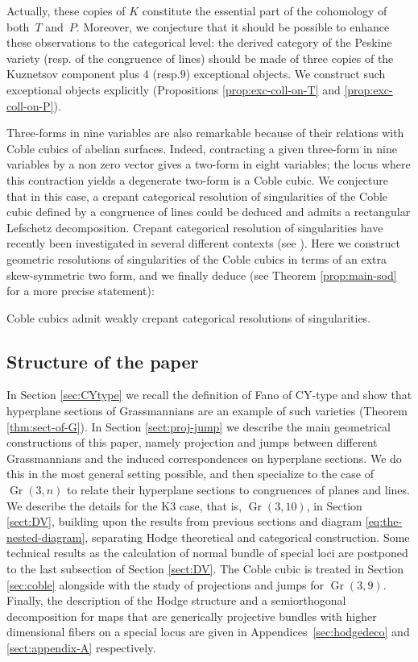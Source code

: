 \documentclass[11pt]{article}
\newcommand{\resp}{resp.\xspace}
\theoremstyle{plain}
\theoremstyle{definition}
\DeclareMathOperator{\Gr}{Gr}
\begin{document}
Actually, these copies of $K$ constitute the essential part of the cohomology
of both~$T$ and~$P$.
Moreover, we conjecture that it should be possible to enhance these observations to the categorical
level: the derived category of the Peskine variety (\resp of the congruence of lines)
should be made of three copies of the Kuznetsov component plus $4$ (\resp $9$) exceptional
objects. We construct such exceptional objects explicitly (Propositions \ref{prop:exc-coll-on-T} and \ref{prop:exc-coll-on-P}).

Three-forms in nine variables are also remarkable because of their relations with
Coble cubics of abelian surfaces. Indeed, contracting a given
three-form in nine variables by a non zero vector gives a two-form in eight
variables; the locus where this contraction yields a degenerate two-form is
a Coble cubic. We conjecture that in this case, a crepant categorical
resolution of singularities of the Coble cubic defined by a congruence of lines could be deduced and admits a rectangular Lefschetz decomposition. Crepant categorical resolution of singularities
have recently been investigated in several different contexts (see \cite{kuz-lefschetz,
leuschke, lunts}). Here we construct geometric resolutions of
singularities of the Coble cubics in terms of an extra skew-symmetric two form,
and we finally deduce
(see Theorem \ref{prop:main-sod} for a more precise statement):

\begin{theorem*}
Coble cubics admit weakly crepant categorical resolutions of singularities.
\end{theorem*}

\subsection*{Structure of the paper}
In Section \ref{sec:CYtype} we recall the definition of Fano of CY-type and show that hyperplane sections of Grassmannians are an
example of such varieties (Theorem \ref{thm:sect-of-G}). In Section \ref{sect:proj-jump} we describe the main geometrical constructions
of this paper, namely projection and jumps between different Grassmannians and the induced correspondences on hyperplane sections.
We do this in the most general setting possible, and then specialize to the case of $\Gr(3,n)$ to relate their hyperplane sections
to congruences of planes and lines. We describe the details for the K3 case, that is, $\Gr(3,10)$, in Section \ref{sect:DV}, building upon the results
from previous sections and diagram \eqref{eq:the-nested-diagram}, separating Hodge theoretical and categorical construction. Some technical
results as the calculation of normal bundle of special loci are postponed to the last subsection of Section \ref{sect:DV}.
The Coble cubic is treated in Section \ref{sec:coble} alongside with the study of projections and jumps for $\Gr(3,9)$.
Finally, the description of the Hodge structure and a semiorthogonal decomposition for maps that are generically projective bundles
with higher dimensional fibers on a special locus are given in Appendices~\ref{sec:hodgedeco} and \ref{sect:appendix-A} respectively.
\end{document}
